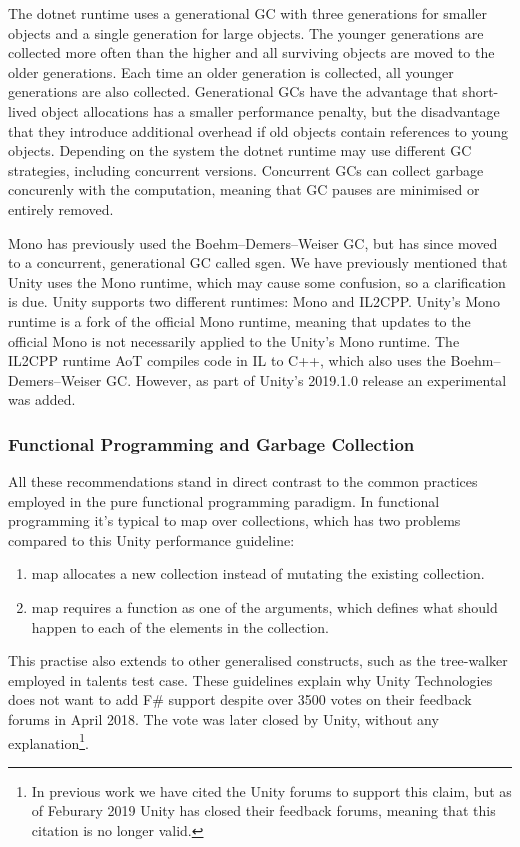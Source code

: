 The dotnet runtime uses a generational \gls{GC} with three generations for smaller objects and a single generation for large objects\cite{dotnet:gc}. The younger generations are collected more often than the higher and all surviving objects are moved to the older generations. Each time an older generation is collected, all younger generations are also collected. Generational \glspl{GC} have the advantage that short-lived object allocations has a smaller performance penalty, but the disadvantage that they introduce additional overhead if old objects contain references to young objects\cite{sestoft2017programming}. Depending on the system the dotnet runtime may use different \gls{GC} strategies, including concurrent versions\cite{dotnet:gc}. Concurrent \glspl{GC} can collect garbage concurenly with the computation, meaning that \gls{GC} pauses are minimised or entirely removed\cite{dotnet:gc}.

Mono has previously used the Boehm–Demers–Weiser \gls{GC}, but has since moved to a concurrent, generational \gls{GC} called sgen\cite{mono:gc}. We have previously mentioned that Unity uses the Mono runtime, which may cause some confusion, so a clarification is due. Unity supports two different runtimes: Mono and IL2CPP. Unity's Mono runtime is a fork of the official Mono runtime\cite{unity:mono:github}, meaning that updates to the official Mono is not necessarily applied to the Unity's Mono runtime. The IL2CPP runtime \gls{AoT} compiles code in \gls{IL} to C++, which also uses the Boehm–Demers–Weiser \gls{GC}\cite{il2cpp:gc}. However, as part of Unity's 2019.1.0 release an experimental \textit{} was added\cite{unity:roadmap}.

\subsubsection{Functional Programming and Garbage Collection}
All these recommendations stand in direct contrast to the common practices employed in the pure functional programming paradigm. In functional programming it's typical to map over collections, which has two problems compared to this Unity performance guideline:
\begin{enumerate}
    \item map allocates a new collection instead of mutating the existing collection.
    \item map requires a function as one of the arguments, which defines what should happen to each of the elements in the collection.
\end{enumerate}
This practise also extends to other generalised constructs, such as the tree-walker employed in talents test case. These guidelines explain why Unity Technologies does not want to add F\# support despite over 3500 votes on their feedback forums in April 2018\cite{unity:fsharp}. The vote was later closed by Unity, without any explanation\footnote{In previous work we have cited the Unity forums to support this claim\cite{p92018gameplay}, but as of Feburary 2019 Unity has closed their feedback forums, meaning that this citation is no longer valid.}.

